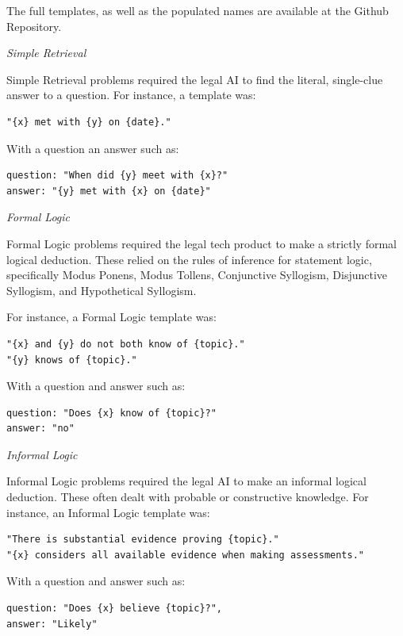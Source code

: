 \documentclass[
]{article}
\begin{document}
The full templates, as well as the populated names are available at the Github Repository.

\emph{Simple Retrieval}

Simple Retrieval problems required the legal AI to find the literal, single-clue answer to a question. For instance, a template was:

\begin{verbatim}
"{x} met with {y} on {date}."
\end{verbatim}

With a question an answer such as:

\begin{verbatim}
question: "When did {y} meet with {x}?"
answer: "{y} met with {x} on {date}"
\end{verbatim}

\emph{Formal Logic}

Formal Logic problems required the legal tech product to make a strictly formal logical deduction. These relied on the rules of inference for statement logic, specifically Modus Ponens, Modus Tollens, Conjunctive Syllogism, Disjunctive Syllogism, and Hypothetical Syllogism.

For instance, a Formal Logic template was:

\begin{verbatim}
"{x} and {y} do not both know of {topic}."
"{y} knows of {topic}."
\end{verbatim}

With a question and answer such as:

\begin{verbatim}
question: "Does {x} know of {topic}?"
answer: "no"
\end{verbatim}

\emph{Informal Logic}

Informal Logic problems required the legal AI to make an informal logical deduction. These often dealt with probable or constructive knowledge. For instance, an Informal Logic template was:

\begin{verbatim}
"There is substantial evidence proving {topic}."
"{x} considers all available evidence when making assessments."
\end{verbatim}

With a question and answer such as:

\begin{verbatim}
question: "Does {x} believe {topic}?",
answer: "Likely"
\end{verbatim}
\end{document}
